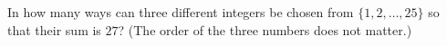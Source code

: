 In how many ways can three different integers be chosen from $\{1,2,\dots,25\}$ so that their sum is $27$? (The order of the three numbers does not matter.)
